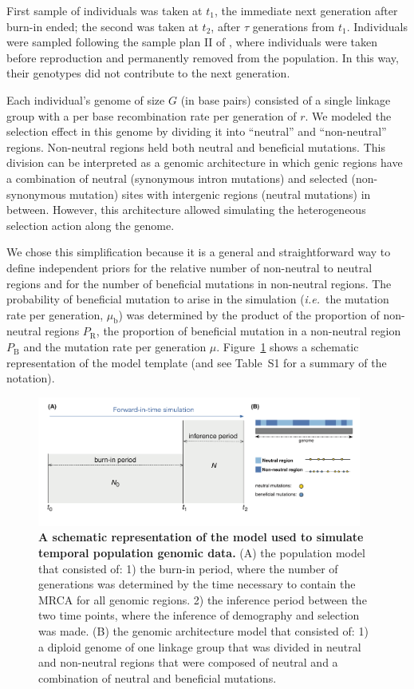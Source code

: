 \documentclass[a4paper, 12pt]{article}
\begin{document}
First sample of individuals was taken at $t_1$, the immediate next generation after burn-in ended; the second was taken at $t_2$, after $\tau$ generations from $t_1$. Individuals were sampled following the sample plan II of \citet{Nei:1981vb}, where individuals were taken before reproduction and permanently removed from the population. In this way, their genotypes did not contribute to the next generation.

Each individual's genome of size $G$ (in base pairs) consisted of a single linkage group with a per base recombination rate per generation of $r$. We modeled the selection effect in this genome by dividing it into ``neutral'' and ``non-neutral'' regions. Non-neutral regions held both neutral and beneficial mutations. This division can be interpreted as a genomic architecture in which genic regions have a combination of neutral (synonymous intron mutations) and selected (non-synonymous mutation) sites with intergenic regions (neutral mutations) in between. However, this architecture allowed simulating the heterogeneous selection action along the genome. 

We chose this simplification because it is a general and straightforward way to define independent priors for the relative number of non-neutral to neutral regions and for the number of beneficial mutations in non-neutral regions. The probability of beneficial mutation to arise in the simulation (\textit{i.e.}~the mutation rate per generation, $\mu_\mathrm{b}$) was determined by the product of the proportion of non-neutral regions $P_\mathrm{R}$, the proportion of beneficial mutation in a non-neutral region $P_\mathrm{B}$ and the mutation rate per generation $\mu$. Figure~\ref{fig:model} shows a schematic representation of the model template (and see Table~S1 for a summary of the notation).

\begin{figure}[ht]
  \centering
  \includegraphics[width=0.95\textwidth]{Figures/Figure1_model.pdf}
  \small\caption{\textbf{A schematic representation of the model used to simulate temporal population genomic data.} (A) the population model that consisted of: 1) the burn-in period, where the number of generations was determined by the time necessary to contain the MRCA for all genomic regions. 2) the inference period between the two time points, where the inference of demography and selection was made. (B) the genomic architecture model that consisted of: 1) a diploid genome of one linkage group that was divided in neutral and non-neutral regions that were composed of neutral and a combination of neutral and beneficial mutations.}\label{fig:model}
\end{figure}
\end{document}
